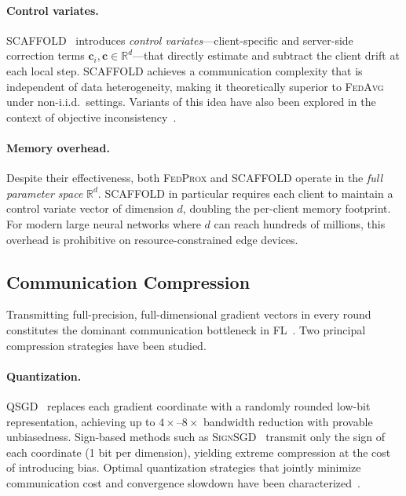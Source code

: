 \paragraph{Control variates.}
\textsc{SCAFFOLD}~\citep{karimireddy2020scaffold} introduces
\emph{control variates}—client-specific and server-side correction
terms $\mathbf{c}_i, \mathbf{c} \in \mathbb{R}^d$—that directly
estimate and subtract the client drift at each local step.
\textsc{SCAFFOLD} achieves a communication complexity that is
independent of data heterogeneity, making it theoretically superior to
\textsc{FedAvg} under non-i.i.d.\ settings.
Variants of this idea have also been explored in the context of
objective inconsistency~\citep{wang2020tackling}.

\paragraph{Memory overhead.}
Despite their effectiveness, both \textsc{FedProx} and
\textsc{SCAFFOLD} operate in the \emph{full parameter space}
$\mathbb{R}^d$.
\textsc{SCAFFOLD} in particular requires each client to maintain a
control variate vector of dimension $d$, doubling the per-client memory
footprint.
For modern large neural networks where $d$ can reach hundreds of
millions, this overhead is prohibitive on resource-constrained edge
devices.

\subsection{Communication Compression}
\label{subsec:compression}

Transmitting full-precision, full-dimensional gradient vectors in every
round constitutes the dominant communication bottleneck in
FL~\citep{konecny2016federated}.
Two principal compression strategies have been studied.

\paragraph{Quantization.}
\textsc{QSGD}~\citep{alistarh2017qsgd} replaces each gradient
coordinate with a randomly rounded low-bit representation, achieving
up to $4\times$–$8\times$ bandwidth reduction with provable
unbiasedness.
Sign-based methods such as \textsc{SignSGD}~\citep{bernstein2018signsgd}
transmit only the sign of each coordinate (1 bit per dimension),
yielding extreme compression at the cost of introducing bias.
Optimal quantization strategies that jointly minimize communication
cost and convergence slowdown have been
characterized~\citep{albasyoni2020optimal}.

